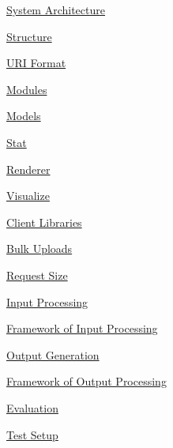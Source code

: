 \documentclass[10pt,a4paper,english]{article}
\begin{document}
\begin{list}{}{}
\item {} \href{\#system-architecture}{System Architecture}
\begin{list}{}{}
\item {} \href{\#structure}{Structure}
\begin{list}{}{}
\item {} \href{\#uri-format}{URI Format}

\item {} \href{\#modules}{Modules}
\begin{list}{}{}
\item {} \href{\#models}{Models}

\item {} \href{\#stat}{Stat}

\item {} \href{\#renderer}{Renderer}

\item {} \href{\#visualize}{Visualize}

\end{list}

\end{list}

\item {} \href{\#client-libraries}{Client Libraries}
\begin{list}{}{}
\item {} \href{\#bulk-uploads}{Bulk Uploads}

\item {} \href{\#request-size}{Request Size}

\end{list}

\item {} \href{\#input-processing}{Input Processing}
\begin{list}{}{}
\item {} \href{\#framework-of-input-processing}{Framework of Input Processing}

\end{list}

\item {} \href{\#output-generation}{Output Generation}
\begin{list}{}{}
\item {} \href{\#framework-of-output-processing}{Framework of Output Processing}

\end{list}

\end{list}

\item {} \href{\#evaluation}{Evaluation}
\begin{list}{}{}
\item {} \href{\#test-setup}{Test Setup}


\end{list}
\end{list}
\end{document}
